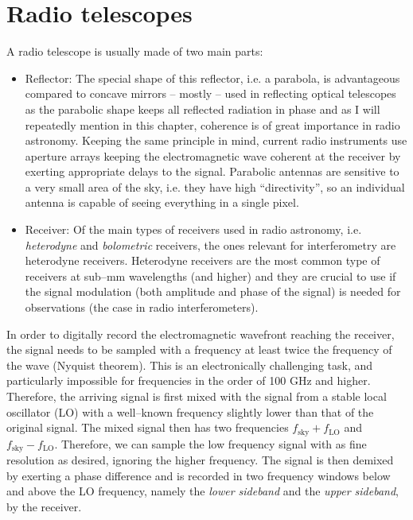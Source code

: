 \documentclass[a4wide,12pt]{book}
\begin{document}
\section{Radio telescopes}
A radio telescope is usually made of two main parts:
\begin{itemize}
\item Reflector: The special shape of this reflector, i.e. a parabola, is advantageous compared to concave mirrors -- mostly -- used in reflecting optical telescopes as the parabolic shape keeps all reflected radiation in phase and as I will repeatedly mention in this chapter, coherence is of great importance in radio astronomy. Keeping the same principle in mind, current radio instruments use aperture arrays keeping the electromagnetic wave coherent at the receiver by exerting appropriate delays to the signal. Parabolic antennas are sensitive to a very small area of the sky, i.e. they have high ``directivity'', so an individual antenna is capable of seeing everything in a single pixel.
\item Receiver: Of the main types of receivers used in radio astronomy, i.e. \emph{heterodyne} and \emph{bolometric} receivers, the ones relevant for interferometry are heterodyne receivers. Heterodyne receivers are the most common type of receivers at sub--mm wavelengths (and higher) and they are crucial to use if the signal modulation (both amplitude and phase of the signal) is needed for observations (the case in radio interferometers).
\end{itemize}

In order to digitally record the electromagnetic wavefront reaching the receiver, the signal needs to be sampled with a frequency at least twice the frequency of the wave (Nyquist theorem). This is an electronically challenging task, and particularly impossible for frequencies in the order of 100 GHz and higher. Therefore, the arriving signal is first mixed with the signal from a stable local oscillator (LO) with a well--known frequency slightly lower than that of the original signal. The mixed signal then has two frequencies $f_\mathrm{sky} + f_\mathrm{LO}$ and $f_\mathrm{sky} - f_\mathrm{LO}$. Therefore, we can sample the low frequency signal with as fine resolution as desired, ignoring the higher frequency. The signal is then demixed by exerting a phase difference and is recorded in two frequency windows below and above the LO frequency, namely the \emph{lower sideband} and the \emph{upper sideband}, by the receiver.
\end{document}
